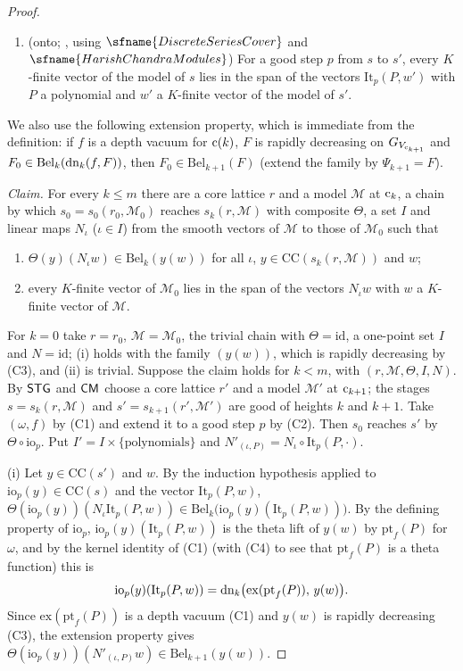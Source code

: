 \begin{proof}
\begin{enumerate}[label=(C\arabic*)]
function if and only if its exchange is.
\item (onto; , using $\sfname{DiscreteSeriesCover}$ and $\sfname{HarishChandraModules}$) For a
good step $p$ from $s$ to $s'$, every $K$-finite vector of the model of $s$ lies in the span of the vectors $\mathrm{It}_p(P,w')$ with $P$ a
polynomial and $w'$ a $K$-finite vector of the model of $s'$.
\end{enumerate}
We also use the following extension property, which is immediate from the definition: if $f$ is a depth vacuum for $\mathrm{c}(k)$, $F$ is rapidly
decreasing on $G_{V_{\mathrm{c}_{k+1}}}$ and $F_0\in\mathrm{Bel}_k(\mathrm{dn}_k(f,F))$, then $F_0\in\mathrm{Bel}_{k+1}(F)$ (extend the family by
$\Psi_{k+1}=F$).

\emph{Claim.} For every $k\le m$ there are a core lattice $r$ and a model $\mathcal M$ at $\mathrm{c}_k$, a chain by which $s_0=s_0(r_0,\mathcal M_0)$
reaches $s_k(r,\mathcal M)$ with composite $\Theta$, a set $I$ and linear maps $N_\iota$ ($\iota\in I$) from the smooth vectors of $\mathcal M$
to those of $\mathcal M_0$ such that
\begin{enumerate}[label=(\roman*)]
\item $\Theta(y)(N_\iota w)\in\mathrm{Bel}_k(y(w))$ for all $\iota$, $y\in\mathrm{CC}(s_k(r,\mathcal M))$ and $w$;
\item every $K$-finite vector of $\mathcal M_0$ lies in the span of the vectors $N_\iota w$ with $w$ a $K$-finite vector of $\mathcal M$.
\end{enumerate}

For $k=0$ take $r=r_0$, $\mathcal M=\mathcal M_0$, the trivial chain with $\Theta=\mathrm{id}$, a one-point set $I$ and $N=\mathrm{id}$; (i)
holds with the family $(y(w))$, which is rapidly decreasing by (C3), and (ii) is trivial. Suppose the claim holds for $k<m$, with
$(r,\mathcal M,\Theta,I,N)$. By $\mathsf{STG}$ and $\mathsf{CM}$ choose a core lattice $r'$ and a model $\mathcal M'$ at $\mathrm{c}_{k+1}$; the stages
$s=s_k(r,\mathcal M)$ and $s'=s_{k+1}(r',\mathcal M')$ are good of heights $k$ and $k+1$. Take $(\omega,f)$ by (C1) and extend it to a good step $p$
by (C2). Then $s_0$ reaches $s'$ by $\Theta\circ\mathrm{io}_p$. Put $I'=I\times\{\text{polynomials}\}$ and $N'_{(\iota,P)}=N_\iota\circ\mathrm{It}_p(P,\cdot)$.

(i) Let $y\in\mathrm{CC}(s')$ and $w$. By the induction hypothesis applied to $\mathrm{io}_p(y)\in\mathrm{CC}(s)$ and the vector $\mathrm{It}_p(P,w)$,
$\Theta(\mathrm{io}_p(y))(N_\iota\mathrm{It}_p(P,w))\in\mathrm{Bel}_k\bigl(\mathrm{io}_p(y)(\mathrm{It}_p(P,w))\bigr)$. By the defining property of
$\mathrm{io}_p$, $\mathrm{io}_p(y)(\mathrm{It}_p(P,w))$ is the theta lift of $y(w)$ by $\mathrm{pt}_f(P)$ for $\omega$, and by the kernel identity of
(C1) (with (C4) to see that $\mathrm{pt}_f(P)$ is a theta function) this is
\[
\mathrm{io}_p(y)(\mathrm{It}_p(P,w))=\mathrm{dn}_k\bigl(\mathrm{ex}(\mathrm{pt}_f(P)),\,y(w)\bigr).
\]
Since $\mathrm{ex}(\mathrm{pt}_f(P))$ is a depth vacuum (C1) and $y(w)$ is rapidly decreasing (C3), the extension property gives
$\Theta(\mathrm{io}_p(y))(N'_{(\iota,P)}w)\in\mathrm{Bel}_{k+1}(y(w))$.


\end{proof}

